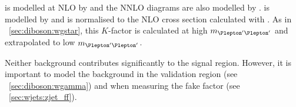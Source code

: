 \ZZ is modelled at NLO by  and the NNLO \ggZZ diagrams are also 
modelled by \meps{\ggtozz}{\fherwig}. \Zgstar is modelled by \sherpa and is normalised to the 
NLO cross section calculated with \mcfm. As in \Section~\ref{sec:diboson:wgstar}, this 
$K$-factor is calculated at high $m_{\HepProcess{\Plepton'\Plepton'}}$ and extrapolated to 
low $m_{\HepProcess{\Plepton'\Plepton'}}$.

Neither background contributes significantly to the signal region. However, it is important 
to model the \Zgstar background in the \Zgamma validation region (see 
\Section~\ref{sec:diboson:wgamma}) and when measuring the \Zjets fake factor (see 
\Section~\ref{sec:wjets:zjet_ff}).


